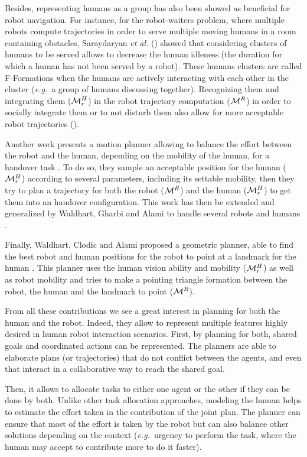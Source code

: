 \documentclass[a4paper,11pt,twoside]{StyleThese}
\begin{document}
Besides, representing humans as a group has also been showed as beneficial for robot navigation. For instance, for the robot-waiters problem, where multiple robots compute trajectories in order to serve multiple moving humans in a room containing obstacles, Saraydaryan \textit{et al.} (\cite{saraydaryan2015robots}) showed that considering clusters of humans to be served allows to decrease the human idleness (the duration for which a human has not been served by a robot). These humans clusters are called F-Formations when the humans are actively interacting with each other in the cluster (\textit{e.g.}~a group of humans discussing together). Recognizing them and integrating them ($\mathcal{M}^H_r$) in the robot trajectory computation ($\mathcal{M}^R$) in order to socially integrate them or to not disturb them also allow for more acceptable robot trajectories (\cite{althaus2004navigation}).

Another work presents a motion planner allowing to balance the effort between the robot and the human, depending on the mobility of the human, for a handover task \cite{mainprice2012sharing}. To do so, they sample an acceptable position for the human ($\mathcal{M}^H_r$) according to several parameters, including its settable mobility, then they try to plan a trajectory for both the robot ($\mathcal{M}^R$) and the human ($\mathcal{M}^H_r$) to get them into an handover configuration. This work has then be extended and generalized by Waldhart, Gharbi and Alami to handle several robots and humans \cite{waldhart2015planning}.

Finally, Waldhart, Clodic and Alami proposed a geometric planner, able to find the best robot and human positions for the robot to point at a landmark for the human \cite{waldhart_reasoning_shared_2019}. This planner uses the human vision ability and mobility ($\mathcal{M}^H_r$) as well as robot mobility and tries to make a pointing triangle formation between the robot, the human and the landmark to point ($\mathcal{M}^R$).

From all these contributions we see a great interest in planning for both the human and the robot. Indeed, they allow to represent multiple features highly desired in human robot interaction scenarios. First, by planning for both, shared goals and coordinated actions can be represented. The planners are able to elaborate plans (or trajectories) that do not conflict between the agents, and even that interact in a collaborative way to reach the shared goal. 

Then, it allows to allocate tasks to either one agent or the other if they can be done by both. Unlike other task allocation approaches, modeling the human helps to estimate the effort taken in the contribution of the joint plan. The planner can ensure that most of the effort is taken by the robot but can also balance other solutions depending on the context (\textit{e.g.}~urgency to perform the task, where the human may accept to contribute more to do it faster). 
\end{document}
